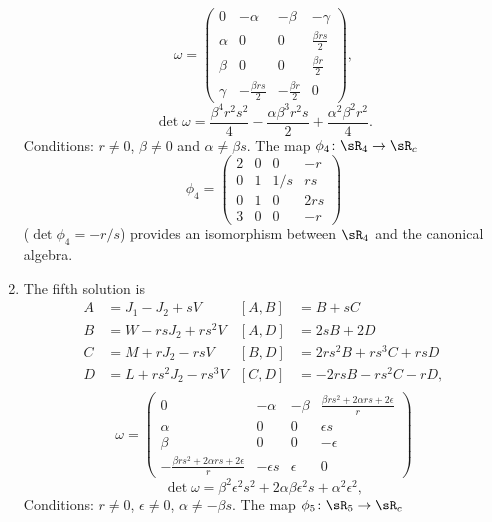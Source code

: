 \begin{enumerate}
\begin{align*}
 \end{align*}
\begin{equation}
\omega=\begin{pmatrix}
0   &-\alpha        &-\beta &-\gamma\\
\alpha  &0          &0  &\frac{ \beta r s  }{ 2 }\\
\beta   &0          &0  &\frac{ \beta r }{2}\\
\gamma  &-\frac{ \beta r s  }{ 2 }  &-\frac{ \beta r }{2}   &0
\end{pmatrix},
\end{equation}
\[
\det\omega=\frac{ \beta^{4}r^{2}s^{2} }{ 4 }-\frac{ \alpha\beta^{3}r^{2}s }{ 2 }+\frac{ \alpha^{2}\beta^{2}r^{2} }{ 4 }.
\]
Conditions:  $r\neq 0$, $\beta\neq 0$ and $\alpha\neq\beta s$.  The map $\phi_4\colon \sR_4\to \sR_c$
\[
  \phi_{4}=
\begin{pmatrix}
2&0&0&-r\\
0&1&1/s&rs\\
0&1&0&2rs\\
3&0&0&-r
\end{pmatrix}
\]
($\det\phi_4=-r/s$)  provides an isomorphism between $\sR_{4}$ and the canonical algebra.
\item The fifth solution is
\begin{align*}
A&=J_{1}-J_{2}+sV       &[A,B]&=B+sC\\
B&=W-rsJ_{2}+rs^{2}V        &[A,D]&=2sB+2D\\
C&=M+rJ_{2}-rsV         &[B,D]&=2rs^{2}B+rs^{3}C+rsD\\
D&=L+rs^{2}J_{2}-rs^{3}V    &[C,D]&=-2rsB-rs^{2}C-rD,\\
\end{align*}
\begin{equation}
\omega=\begin{pmatrix}
0&-\alpha&-\beta&\frac{ \beta r s^{2}+2\alpha r s+2\epsilon }{ r }\\
\alpha&0&0&\epsilon s\\
\beta&0&0&-\epsilon\\
-\frac{ \beta r s^{2}+2\alpha r s+2\epsilon }{ r }&-\epsilon s&\epsilon&0
\end{pmatrix}
\end{equation}
\begin{equation}
\det\omega=\beta^{2}\epsilon^{2}s^{2}+2\alpha\beta\epsilon^{2}s+\alpha^{2}\epsilon^{2},
\end{equation}
Conditions:  $r\neq 0$, $\epsilon\neq 0$, $\alpha\neq -\beta s$.  The map $\phi_5\colon \sR_5\to \sR_c$
\begin{equation}

\end{equation}
\end{enumerate}
